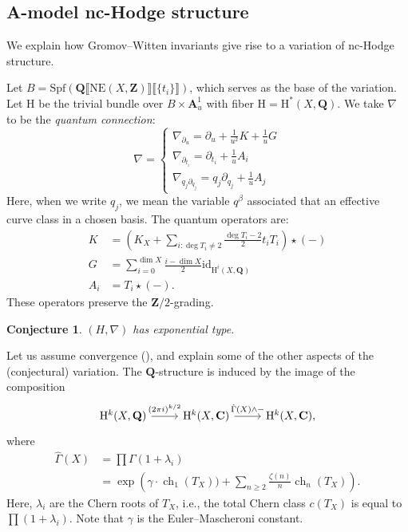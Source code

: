 \documentclass[11pt, reqno]{amsart}
\numberwithin{equation}{section}
\theoremstyle{plain}
\newtheorem{conjecture}[theorem]{Conjecture}
\theoremstyle{definition}
\theoremstyle{italicsname}
\newcommand{\id}{\mathrm{id}}
\DeclareMathOperator{\ch}{{ch}}
\newcommand{\rH}{\mathrm{H}}
\newcommand{\bA}{\mathbf{A}}
\newcommand{\bC}{\mathbf{C}}
\newcommand{\bZ}{\mathbf{Z}}
\newcommand{\bQ}{\mathbf{Q}}
\newcommand{\Spf}{\mathrm{Spf}}
\begin{document}
\subsection*{A-model nc-Hodge structure}
We explain how Gromov--Witten invariants give rise to a variation of nc-Hodge structure.

Let $B = \Spf(\bQ\llbracket \mathrm{NE}(X, \bZ)\rrbracket\llbracket\{t_i\}\rrbracket)$, which serves as the base of the variation.
Let $\rH$ be the trivial bundle over $B \times \bA^1_u$ with fiber $\rH= \rH^*(X, \bQ)$. We take $\nabla$ to be the \emph{quantum connection}:
\begin{equation*}
    \nabla = \begin{cases}
        \nabla_{\partial_u} = \partial_u + \frac{1}{u^2} K + \frac{1}{u} G \\
        \nabla_{\partial_{t_i}} = \partial_{t_i} + \frac{1}{u} A_i \\
        \nabla_{q_j \partial_{q_j}} = q_j \partial_{q_j} + \frac{1}{u} A_j
    \end{cases}
\end{equation*}
Here, when we write $q_j$, we mean the variable $q^\beta$ associated that an effective curve class in a chosen basis. 
The quantum operators are:
\begin{align*}
    K &= \left(K_X + \sum_{i:\deg T_i \neq 2} \frac{\deg T_i - 2}{2} t_i T_i \right) \star (-) \\
    G &= \sum_{i = 0}^{\dim X} \frac{i - \dim X}{2} \id_{\rH^i(X, \bQ)} \\
    A_i &= T_i \star (-).
\end{align*}
These operators preserve the $\bZ/2$-grading.

\begin{conjecture}
    $(H, \nabla)$ has exponential type. 
\end{conjecture}

Let us assume convergence (), and explain some of the other aspects of the (conjectural) variation. The $\bQ$-structure is induced by the image of the composition 
\[
    \begin{tikzcd}
        \rH^k(X, \bQ) \ar[r, "(2 \pi i)^{k/2}"] & \rH^k(X, \bC) \ar[r, "\hat \Gamma(X) \wedge -"] & \rH^k(X, \bC),
    \end{tikzcd}
\]
where 
\begin{align*}
    \hat\Gamma(X) &= \prod \Gamma(1 + \lambda_i) \\
        &= \exp\left(\gamma \cdot \ch_1(T_X)) + \sum_{n \geq 2} \frac{\zeta(n)}{n} \ch_n(T_X) \right).
\end{align*}
Here, $\lambda_i$ are the Chern roots of $T_X$, i.e., the total Chern class $c(T_X)$ is equal to $\prod (1 + \lambda_i)$. Note that $\gamma$ is the Euler--Mascheroni constant. 
\end{document}
